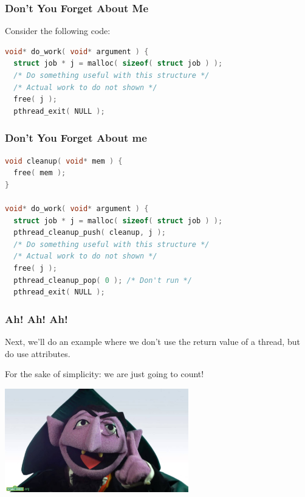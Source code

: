 \begin{frame}[fragile]
	\frametitle{Don't You Forget About Me}

	Consider the following code:
	\begin{lstlisting}[language=C]
void* do_work( void* argument ) {
  struct job * j = malloc( sizeof( struct job ) );
  /* Do something useful with this structure */
  /* Actual work to do not shown */
  free( j );
  pthread_exit( NULL );
\end{lstlisting}


\end{frame}



\begin{frame}[fragile]
	\frametitle{Don't You Forget About me}

	\begin{lstlisting}[language=C]
void cleanup( void* mem ) {
  free( mem );
}

void* do_work( void* argument ) {
  struct job * j = malloc( sizeof( struct job ) );
  pthread_cleanup_push( cleanup, j );
  /* Do something useful with this structure */
  /* Actual work to do not shown */
  free( j );
  pthread_cleanup_pop( 0 ); /* Don't run */
  pthread_exit( NULL );
\end{lstlisting}


\end{frame}


\begin{frame}
	\frametitle{Ah! Ah! Ah!}

	Next, we'll do an example where we don't use the return value of a thread, but do use attributes.

	For the sake of simplicity: we are just going to count!

	\begin{center}
		\includegraphics[width=0.6\textwidth]{images/countvoncount.jpg}
	\end{center}


\end{frame}



